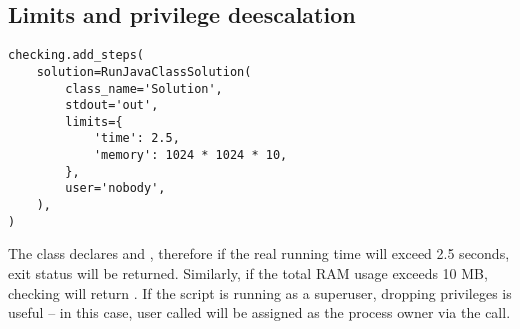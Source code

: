 \subsection{Limits and privilege deescalation}

\begin{verbatim}
checking.add_steps(
    solution=RunJavaClassSolution(
        class_name='Solution',
        stdout='out',
        limits={
            'time': 2.5,
            'memory': 1024 * 1024 * 10,
        },
        user='nobody',
    ),
)
\end{verbatim}

The  class declares \hyperref[subsec:UsedTimePostcondition]{}
and \hyperref[subsec:UsedMemoryPostcondition]{}, therefore if the real running time will
exceed 2.5 seconds,  exit status will be returned.
Similarly, if the total RAM usage exceeds 10 MB, checking will return .
If the script is running as a superuser, dropping privileges is useful -- in this case, user called  will
be assigned as the process owner via the  call.
